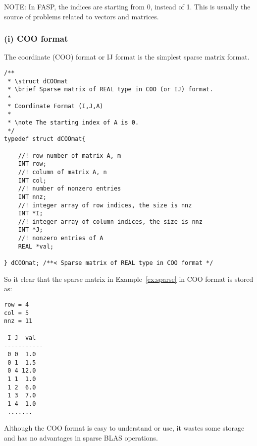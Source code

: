 \documentclass[11pt]{memoir}
\begin{document}
\begin{snugshade}\noindent
NOTE: In FASP, the indices are starting from 0, instead of 1. This is usually the source of problems related to vectors and matrices. 
\end{snugshade}

\subsubsection*{(i) COO format}

The coordinate (COO) format or IJ format is the simplest sparse matrix format. 
\begin{lstlisting}
/** 
 * \struct dCOOmat
 * \brief Sparse matrix of REAL type in COO (or IJ) format.
 *
 * Coordinate Format (I,J,A)
 *
 * \note The starting index of A is 0.
 */
typedef struct dCOOmat{
	
	//! row number of matrix A, m
	INT row;   
	//! column of matrix A, n
	INT col;   
	//! number of nonzero entries
	INT nnz;
	//! integer array of row indices, the size is nnz
	INT *I;   
	//! integer array of column indices, the size is nnz
	INT *J;    
	//! nonzero entries of A
	REAL *val;
	
} dCOOmat; /**< Sparse matrix of REAL type in COO format */
\end{lstlisting}
%
So it clear that the sparse matrix in Example~\ref{ex:sparse} in COO format is stored as:
%
\begin{lstlisting}[numbers=none]
row = 4
col = 5
nnz = 11

 I J  val 
-----------
 0 0  1.0
 0 1  1.5
 0 4 12.0
 1 1  1.0
 1 2  6.0
 1 3  7.0
 1 4  1.0
 .......
\end{lstlisting}
%
Although the COO format is easy to understand or use, it wastes some storage and has no advantages in sparse BLAS operations.
\end{document}
